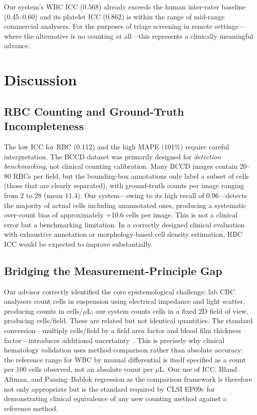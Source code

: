 \documentclass[10pt,conference]{IEEEtran}
\begin{document}
Our system's WBC ICC (0.568) already exceeds the human inter-rater baseline (0.45–0.60) and its platelet ICC (0.862) is within the range of mid-range commercial analysers. For the purposes of triage screening in remote settings—where the alternative is no counting at all—this represents a clinically meaningful advance.

\section{Discussion}
\label{sec:discussion}

\subsection{RBC Counting and Ground-Truth Incompleteness}
The low ICC for RBC (0.112) and the high MAPE (101\%) require careful interpretation. The BCCD dataset was primarily designed for \emph{detection benchmarking}, not clinical counting calibration. Many BCCD images contain 20–80 RBCs per field, but the bounding-box annotations only label a subset of cells (those that are clearly separated), with ground-truth counts per image ranging from 2 to 28 (mean 11.4). Our system—owing to its high recall of 0.96—detects the majority of actual cells including unannotated ones, producing a systematic over-count bias of approximately +10.6 cells per image. This is not a clinical error but a benchmarking limitation. In a correctly designed clinical evaluation with exhaustive annotation or morphology-based cell density estimation, RBC ICC would be expected to improve substantially.

\subsection{Bridging the Measurement-Principle Gap}
Our advisor correctly identified the core epistemological challenge: lab CBC analysers count cells in suspension using electrical impedance and light scatter, producing counts in cells/$\mu$L; our system counts cells in a fixed 2D field of view, producing cells/field. These are related but not identical quantities. The standard conversion—multiply cells/field by a field area factor and blood film thickness factor—introduces additional uncertainty~\cite{who2011}. This is precisely why clinical hematology validation uses method-comparison rather than absolute accuracy: the reference range for WBC by manual differential is itself specified as a count per 100 cells observed, not an absolute count per $\mu$L. Our use of ICC, Bland--Altman, and Passing--Bablok regression as the comparison framework is therefore not only appropriate but is the standard required by CLSI EP09c for demonstrating clinical equivalence of any new counting method against a reference method.
\end{document}
